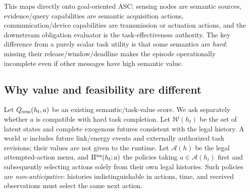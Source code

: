 \documentclass[conference]{IEEEtran}
\newcommand{\Worlds}{\mathcal{W}}
\begin{document}
This maps directly onto goal-oriented ASC: sensing nodes are semantic sources, evidence/query capabilities are semantic acquisition actions, communication/device capabilities are transmission or actuation actions, and the downstream obligation evaluator is the task-effectiveness authority. The key difference from a purely scalar task utility is that some semantics are \emph{hard}: missing their release/window/deadline makes the episode operationally incomplete even if other messages have high semantic value.

\subsection{Why value and feasibility are different}
Let $Q_{\rm sem}(h_t,a)$ be an existing semantic/task-value score. We ask separately whether $a$ is compatible with hard task completion. Let $\Worlds(h_t)$ be the set of latent states and complete exogenous futures consistent with the legal history. A world $w$ includes future link/energy events and externally authorized task revisions; their values are not given to the runtime. Let $\mathcal A(h)$ be the legal attempted-action menu, and $\Pi^{\rm na}(h_t;a)$ the policies taking $a\in\mathcal A(h_t)$ first and subsequently selecting actions solely from their own legal histories. Such policies are \emph{non-anticipative}: histories indistinguishable in actions, time, and received observations must select the same next action.
\end{document}
